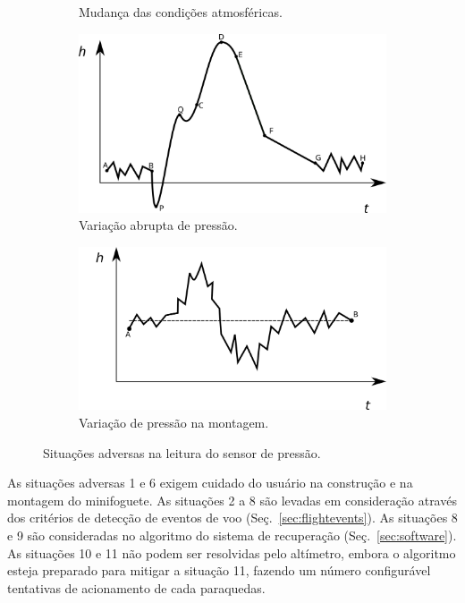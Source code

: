 \documentclass[12pt,a4paper]{article}
\begin{document}
\begin{figure}[!ht]
\begin{subfigure}{0.48\textwidth}
	\caption{Mudança das condições atmosféricas.}
	\label{fig:adverseD}
	\end{subfigure}
	\begin{subfigure}{0.48\textwidth}
		\includegraphics[width=\textwidth]{./fig/trajectoryC}
		\caption{Variação abrupta de pressão.}
		\label{fig:adverseB}
	\end{subfigure}
	\begin{subfigure}{0.48\textwidth}
	\includegraphics[width=\textwidth]{./fig/trajectoryF}
	\caption{Variação de pressão na montagem.}
	\label{fig:adverseF}
	\end{subfigure}
	\caption{Situações adversas na leitura do sensor de pressão.}
	\label{fig:adverse}
\end{figure}

As situações adversas 1 e 6 exigem cuidado do usuário na construção e na montagem do minifoguete. As situações 2 a 8 são levadas em consideração através dos critérios de detecção de eventos de voo (Seç.~\ref{sec:flightevents}). As situações 8 e 9 são consideradas no algoritmo do sistema de recuperação (Seç.~\ref{sec:software}). As situações 10 e 11 não podem ser resolvidas pelo altímetro, embora o algoritmo esteja preparado para mitigar a situação 11, fazendo um número configurável tentativas de acionamento de cada paraquedas.
\end{document}
